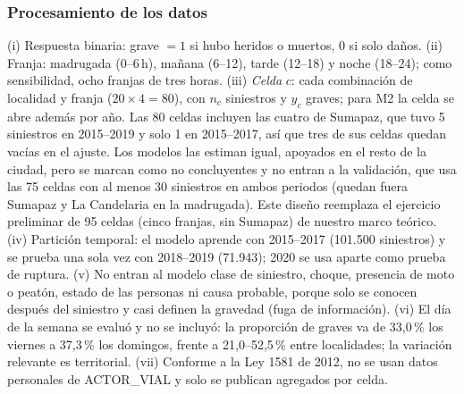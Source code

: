 \documentclass[10pt,twocolumn]{article}
\begin{document}
\subsubsection*{Procesamiento de los datos}
(i) Respuesta binaria: grave $=1$ si hubo heridos o muertos, $0$ si solo daños. (ii) Franja: madrugada (0--6\,h), mañana (6--12), tarde (12--18) y noche (18--24); como sensibilidad, ocho franjas de tres horas. (iii) \emph{Celda} $c$: cada combinación de localidad y franja ($20\times4=80$), con $n_c$ siniestros y $y_c$ graves; para M2 la celda se abre además por año. Las 80 celdas incluyen las cuatro de Sumapaz, que tuvo 5 siniestros en 2015--2019 y solo 1 en 2015--2017, así que tres de sus celdas quedan vacías en el ajuste. Los modelos las estiman igual, apoyados en el resto de la ciudad, pero se marcan como no concluyentes y no entran a la validación, que usa las 75 celdas con al menos 30 siniestros en ambos periodos (quedan fuera Sumapaz y La Candelaria en la madrugada). Este diseño reemplaza el ejercicio preliminar de 95 celdas (cinco franjas, sin Sumapaz) de nuestro marco teórico. (iv) Partición temporal: el modelo aprende con 2015--2017 (101.500 siniestros) y se prueba una sola vez con 2018--2019 (71.943); 2020 se usa aparte como prueba de ruptura. (v) No entran al modelo clase de siniestro, choque, presencia de moto o peatón, estado de las personas ni causa probable, porque solo se conocen después del siniestro y casi definen la gravedad (fuga de información). (vi) El día de la semana se evaluó y no se incluyó: la proporción de graves va de 33,0\,\% los viernes a 37,3\,\% los domingos, frente a 21,0--52,5\,\% entre localidades; la variación relevante es territorial. (vii) Conforme a la Ley 1581 de 2012, no se usan datos personales de ACTOR\_VIAL y solo se publican agregados por celda.
\end{document}
